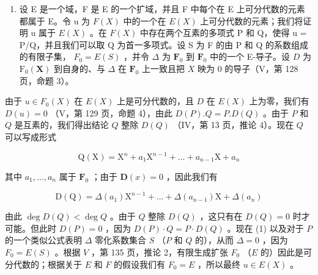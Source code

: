 \begin{enumerate}
\def\labelenumi{\Alph{enumi})}
\tightlist
\item
  设 E 是一个域，F 是 E 的一个扩域，并且 F 中每个在 E 上可分代数的元素都属于 E。令 u 为 \(F(X)\) 中的一个在 \(E(X)\) 上可分代数的元素；我们将证明 u 属于 \(E(X)\) 。在 \(F(X)\) 中存在两个互素的多项式 P 和 Q，使得 u = P/Q，并且我们可以取 Q 为首一多项式。设 S 为 F 的由 P 和 Q 的系数组成的有限子集， \(F_{0} = E(S)\) ，并令 \(\Delta\) 为 \(\mathbf{F}_0\) 到 \(\mathbf{F}_0\) 中的一个 E-导子。设 \(D\) 为 \(\mathrm{F}_0(\mathbf{X})\) 到自身的、与 \(\Delta\) 在 \(\mathbf{F}_0\) 上一致且把 \(X\) 映为 0 的导子（V，第 128 页，命题 3）。
\end{enumerate}

由于 \(u \in F_0(X)\) 在 \(E(X)\) 上是可分代数的，且 \(D\) 在 \(E(X)\) 上为零，我们有 \(D(u) = 0\) （V，第 129 页，命题 4），由此 \(D(P).Q = P.D(Q)\) 。由于 \(P\) 和 \(Q\) 是互素的，我们得出结论 \(Q\) 整除 \(D(Q)\) （IV，第 13 页，推论 4）。现在 \(Q\) 可以写成形式

\[
\mathrm{Q} (\mathrm{X}) = \mathrm{X} ^ {n} + a _ {1} \mathrm{X} ^ {n - 1} + \dots + a _ {n - 1} \mathrm{X} + a _ {n}
\]

其中 \(a_1, \ldots, a_n\) 属于 \(\mathbf{F}_0\) ；由于 \(\mathbf{D}(x) = 0\) ，因此我们有

\[
\mathrm{D} (\mathrm{Q}) = \Delta (a _ {1}) \mathrm{X} ^ {n - 1} + \dots + \Delta (a _ {n - 1}) \mathrm{X} + \Delta (a _ {n})\tag{1}
\]

由此 \(\deg D(Q) < \deg Q\) 。由于 \(Q\) 整除 \(D(Q)\) ，这只有在 \(D(Q) = 0\) 时才可能。但此时 \(D(P) = 0\) ，因为 \(D(P) \cdot Q = P \cdot D(Q)\) 。现在 (1) 以及对于 \(P\) 的一个类似公式表明 \(\Delta\) 零化系数集合 \(S\) （\(P\) 和 \(Q\) 的），从而 \(\Delta = 0\) ，因为 \(F_0 = E(S)\) 。根据 \(V\) ，第 135 页，推论 2，有限生成扩张 \(F_0\) （\(E\) 的）因此是可分代数的；根据关于 \(E\) 和 \(F\) 的假设我们有 \(F_0 = E\) ，所以最终 \(u \in E(X)\) 。

